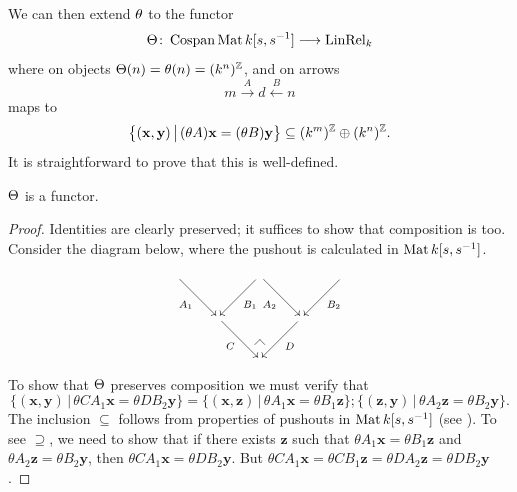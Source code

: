 We can then extend $\theta$ to the functor
\[
  \Theta {\colon} \operatorname{{Cospan}}\operatorname{\mathrm{Mat}}{k[s,s^{-1}]} \longrightarrow \operatorname{\mathrm{LinRel}}_k
\]
where on objects $\Theta(n)=\theta(n)=(k^n)^{\mathbb Z}$, and on arrows
\[
  m\xrightarrow{A} d \xleftarrow{B}n
\]
maps to
\begin{equation}\label{eq.K}
  \big\{(\mathbf{x},\mathbf{y}) \,\big|\,
  (\theta A)\mathbf{x} = (\theta B)\mathbf{y}\big\} 
  \subseteq (k^m)^{\mathbb Z} \oplus (k^n)^{\mathbb Z}.
\end{equation}
It is straightforward to prove that this is well-defined.
\begin{proposition}\label{prop.funct}
$\Theta$ is a functor.
\end{proposition}
\begin{proof}
Identities are clearly preserved; it suffices to show that composition is too.
Consider the diagram below, where the pushout is calculated in $\operatorname{\mathrm{Mat}}{k[s,s^{-1}]}$.
\[
\xymatrix{
  {}\ar[dr]_{A_1} & & \ar[dl]^{B_1}  
  \ar[dr]_{A_2} & & \ar[dl]^{B_2} {} 
 \\
& \ar[dr]_{C} & & \ar[dl]^{D}  \\
& & {\save*!<0cm,-.5cm>[dl]@^{|-}\restore}
}
\]
To show that $\Theta$ preserves composition we must verify that 
\[
  \{(\mathbf{x},\mathbf{y})\,|\, \theta CA_1\mathbf{x} = \theta DB_2\mathbf{y}\} =
  \{(\mathbf{x},\mathbf{z})\,|\, \theta A_1\mathbf{x} = \theta B_1\mathbf{z}\} ; 
  \{(\mathbf{z},\mathbf{y})\,|\, \theta A_2\mathbf{z} = \theta B_2\mathbf{y}\}.
\]
The inclusion $\subseteq$ follows from properties of pushouts in $\operatorname{\mathrm{Mat}}{k[s,s^{-1}]}$ (see
\cite[Proposition 5.7]{BSZ2}).  To see $\supseteq$, we need to show that if there
exists $\mathbf{z}$ such that $\theta A_1\mathbf{x} = \theta B_1\mathbf{z}$ and
$\theta A_2\mathbf{z} = \theta B_2\mathbf{y}$, then $\theta CA_1\mathbf{x} =
\theta DB_2\mathbf{y}$.  But $\theta CA_1\mathbf{x}=\theta CB_1\mathbf{z}=\theta
DA_2\mathbf{z}=\theta DB_2\mathbf{y}$.
\end{proof}




